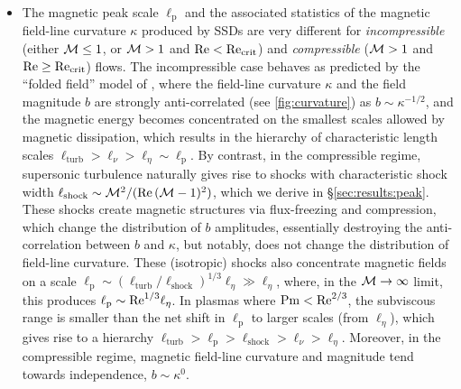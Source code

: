 \begin{itemize}
    \item The magnetic peak scale $\ell_\mathrm{p}$ and the associated statistics of the magnetic field-line curvature $\kappa$ produced by SSDs are very different for \textit{incompressible} (\ie either $\mathcal{M} \leq 1$, or $\mathcal{M} > 1$ and $\mathrm{Re} < \mathrm{Re}_\mathrm{crit}$) and \textit{compressible} (\ie $\mathcal{M} > 1$ and $\mathrm{Re} \geq \mathrm{Re}_\mathrm{crit}$) flows. The incompressible case behaves as predicted by the ``folded field'' model of \citet{schekochihin2002spectra, schekochihin2004simulations}, where the field-line curvature $\kappa$ and the field magnitude $b$ are strongly anti-correlated (see \autoref{fig:curvature}) as $b \sim \kappa^{-1/2}$, and the magnetic energy becomes concentrated on the smallest scales allowed by magnetic dissipation, which results in the hierarchy of characteristic length scales $\ell_\mathrm{turb} > \ell_\nu > \ell_\eta \sim \ell_\mathrm{p}$. By contrast, in the compressible regime, supersonic turbulence naturally gives rise to shocks with characteristic shock width $\ell_\mathrm{shock} \sim \mathcal{M}^2 / (\mathrm{Re}\, (\mathcal{M}-1)^2)$, which we derive in \S\ref{sec:results:peak}. These shocks create magnetic structures via flux-freezing and compression, which change the distribution of $b$ amplitudes, essentially destroying the anti-correlation between $b$ and $\kappa$, but notably, does not change the distribution of field-line curvature. These (isotropic) shocks also concentrate magnetic fields on a scale $\ell_\mathrm{p} \sim (\ell_\mathrm{turb}/\ell_\mathrm{shock})^{1/3} \ell_\eta \gg \ell_\eta$, where, in the $\mathcal{M}\to\infty$ limit, this produces $\ell_\mathrm{p} \sim \mathrm{Re}^{1/3} \ell_\eta$. In plasmas where $\mathrm{Pm} < \mathrm{Re}^{2/3}$, the subviscous range is smaller than the net shift in $\ell_\mathrm{p}$ to larger scales (from $\ell_\eta$), which gives rise to a hierarchy $\ell_\mathrm{turb} > \ell_\mathrm{p} > \ell_\mathrm{shock} > \ell_\nu > \ell_\eta$. Moreover, in the compressible regime, magnetic field-line curvature and magnitude tend towards independence, $b \sim \kappa^0$. \\


\end{itemize}

